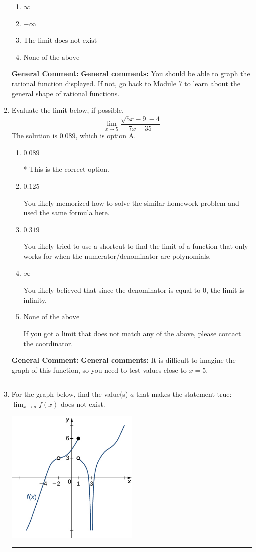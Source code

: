 \documentclass{extbook}[14pt]
\newcommand{\litem}[1]{\item #1

\rule{\textwidth}{0.4pt}}
\begin{document}
\begin{enumerate}
{\begin{enumerate}[label=\Alph*.]
\item \( \infty \)


\item \( -\infty \)


\item \( \text{The limit does not exist} \)


\item \( \text{None of the above} \)


\end{enumerate}

\textbf{General Comment:} \textbf{General comments:} You should be able to graph the rational function displayed. If not, go back to Module 7 to learn about the general shape of rational functions.
}
\litem{
Evaluate the limit below, if possible.
\[ \lim_{x \rightarrow 5} \frac{\sqrt{5x - 9} - 4}{7x - 35} \]The solution is \( 0.089 \), which is option A.\begin{enumerate}[label=\Alph*.]
\item \( 0.089 \)

* This is the correct option.
\item \( 0.125 \)

You likely memorized how to solve the similar homework problem and used the same formula here.
\item \( 0.319 \)

You likely tried to use a shortcut to find the limit of a function that only works for when the numerator/denominator are polynomials.
\item \( \infty \)

You likely believed that since the denominator is equal to 0, the limit is infinity.
\item \( \text{None of the above} \)

If you got a limit that does not match any of the above, please contact the coordinator.
\end{enumerate}

\textbf{General Comment:} \textbf{General comments:} It is difficult to imagine the graph of this function, so you need to test values close to $x = 5$.
}
\litem{
For the graph below, find the value(s) $a$ that makes the statement true: $ \displaystyle \lim_{x \rightarrow a} f(x)$ does not exist.

\begin{center}
    \includegraphics[width=0.5\textwidth]{../Figures/evaluateLimitGraphicallyCopyA.png}
\end{center}


}
\end{enumerate}
\end{document}

